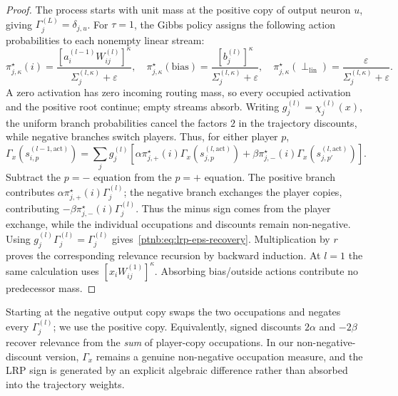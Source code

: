 \begin{proof}
The process starts with unit mass at the positive copy of output neuron $u$, giving $\Gamma_j^{(L)}=\delta_{j,u}$. For $\tau=1$, the Gibbs policy assigns the following action probabilities to each nonempty linear stream:
\begin{equation}\label{ptnb:eq:lrp-eps-policy}
 \pi_{j,\kappa}^\star(i)=\frac{[a_i^{(l-1)}W_{ij}^{(l)}]^\kappa}{\Sigma_j^{(l,\kappa)}+\varepsilon},\quad
 \pi_{j,\kappa}^\star(\mathrm{bias})=\frac{[b_j^{(l)}]^\kappa}{\Sigma_j^{(l,\kappa)}+\varepsilon},\quad
 \pi_{j,\kappa}^\star(\perp_{\mathrm{lin}})=\frac{\varepsilon}{\Sigma_j^{(l,\kappa)}+\varepsilon}.
\end{equation}
A zero activation has zero incoming routing mass, so every occupied activation and the positive root continue; empty streams absorb. Writing $g_j^{(l)}=\chi_j^{(l)}(x)$, the uniform branch probabilities cancel the factors $2$ in the trajectory discounts, while negative branches switch players. Thus, for either player $p$,
\begin{equation}\label{ptnb:eq:routing-per-state-recursion}
 \Gamma_x(s_{i,p}^{(l-1,\mathrm{act})})=\sum_j g_j^{(l)}\left[
 \alpha\pi_{j,+}^\star(i)\Gamma_x(s_{j,p}^{(l,\mathrm{act})})+
 \beta\pi_{j,-}^\star(i)\Gamma_x(s_{j,p'}^{(l,\mathrm{act})})\right].
\end{equation}
Subtract the $p=-$ equation from the $p=+$ equation. The positive branch contributes $\alpha\pi_{j,+}^\star(i)\Gamma_j^{(l)}$; the negative branch exchanges the player copies, contributing $-\beta\pi_{j,-}^\star(i)\Gamma_j^{(l)}$. Thus the minus sign comes from the player exchange, while the individual occupations and discounts remain non-negative. Using $g_j^{(l)}\Gamma_j^{(l)}=\Gamma_j^{(l)}$ gives~\eqref{ptnb:eq:lrp-eps-recovery}. Multiplication by $r$ proves the corresponding relevance recursion by backward induction. At $l=1$ the same calculation uses $[x_iW_{ij}^{(1)}]^\kappa$. Absorbing bias/outside actions contribute no predecessor mass.
\end{proof}
\begin{remark}\label{ptnb:rem:starting-player}\label{ptnb:rem:signed-discount-alt}
Starting at the negative output copy swaps the two occupations and negates every $\Gamma_j^{(l)}$; we use the positive copy. Equivalently, signed discounts $2\alpha$ and $-2\beta$ recover relevance from the \emph{sum} of player-copy occupations. In our non-negative-discount version, $\Gamma_x$ remains a genuine non-negative occupation measure, and the LRP sign is generated by an explicit algebraic difference rather than absorbed into the trajectory weights.
\end{remark}

